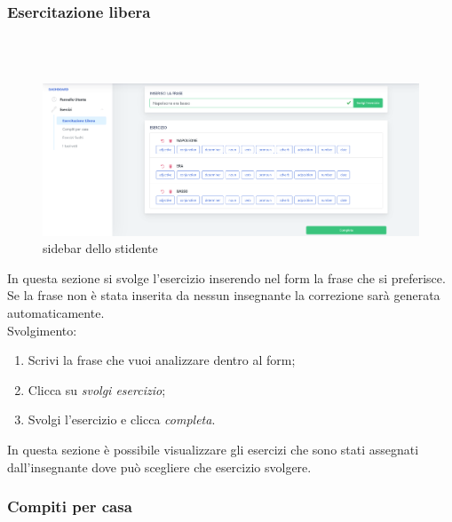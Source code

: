         
               
	\newpage
        \subsubsection{Esercitazione libera}\mbox{}\\ \\        
        	\begin{figure}[H]
                \centering
                \includegraphics[width=17cm]{sez/img/studente/esercitazioneLiberaEsegui.PNG} 
                \caption{sidebar dello stidente}\label{fig:1}
        	\end{figure}
          In questa sezione si svolge l'esercizio inserendo nel form la frase che 
        si preferisce. Se la frase non è stata inserita da nessun insegnante la 
        correzione sarà generata automaticamente.
        \\ Svolgimento:
        	\begin{enumerate}        
            	\item Scrivi la frase che vuoi analizzare dentro al form;
            	\item Clicca su \textit{svolgi esercizio};
            	\item Svolgi l'esercizio e clicca \textit{completa}.
        	\end{enumerate}
           In questa sezione è possibile visualizzare gli esercizi che sono stati assegnati dall'insegnante dove può scegliere che esercizio svolgere.
  
        
        
        
        
        
  		\subsubsection{Compiti per casa}\mbox{}\\ \\
 
